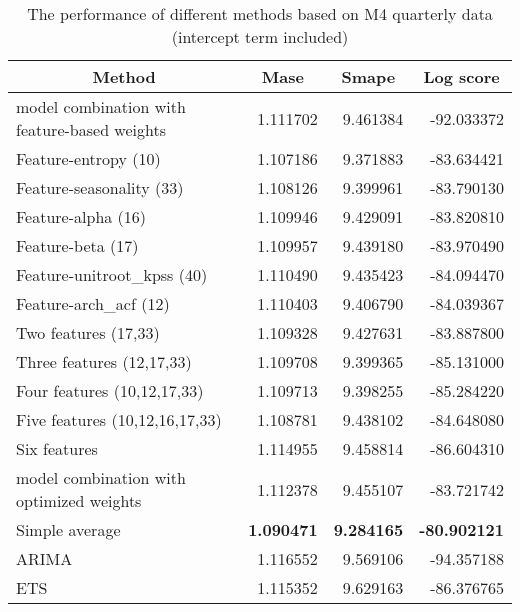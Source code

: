 \documentclass[a4paper,review,11pt,authoryear]{elsarticle}
\begin{document}
\begin{table}[htbp]
	\centering
	\caption{The performance of different methods based on M4 quarterly data (intercept term included)}
	\begin{tabular}{lrrr}
		\toprule
		\multicolumn{1}{c}{Method} & \multicolumn{1}{c}{Mase} & \multicolumn{1}{c}{Smape} & \multicolumn{1}{c}{Log score } \\
		\midrule
		\multicolumn{1}{p{20.72em}}{model combination with feature-based weights } & 1.111702 & 9.461384 & -92.033372 \\
		Feature-entropy (10) & 1.107186 & 9.371883 & -83.634421 \\
		Feature-seasonality (33) & 1.108126 & 9.399961 & -83.790130 \\
		Feature-alpha (16) & 1.109946 & 9.429091 & -83.820810 \\
		Feature-beta (17) & 1.109957 & 9.439180 & -83.970490 \\
		Feature-unitroot\_kpss (40) & 1.110490 & 9.435423 & -84.094470 \\
		Feature-arch\_acf (12) & 1.110403 & 9.406790 & -84.039367 \\
		Two features (17,33) & 1.109328 & 9.427631 & -83.887800 \\
		Three features (12,17,33) & 1.109708 & 9.399365 & -85.131000 \\
		Four features (10,12,17,33) & 1.109713 & 9.398255 & -85.284220 \\
		Five features (10,12,16,17,33) & 1.108781 & 9.438102 & -84.648080 \\
		Six features & 1.114955 & 9.458814 & -86.604310 \\
		\multicolumn{1}{p{20.72em}}{model combination with optimized weights} & 1.112378 & 9.455107 & -83.721742 \\
		\multicolumn{1}{p{20.72em}}{Simple average} & \textbf{1.090471} & \textbf{9.284165} & \textbf{-80.902121} \\
		ARIMA & 1.116552 & 9.569106 & -94.357188 \\
		ETS   & 1.115352 & 9.629163 & -86.376765 \\
		\bottomrule
	\end{tabular}%
	\label{tab:addlabel}%
\end{table}%




%


\end{document}
